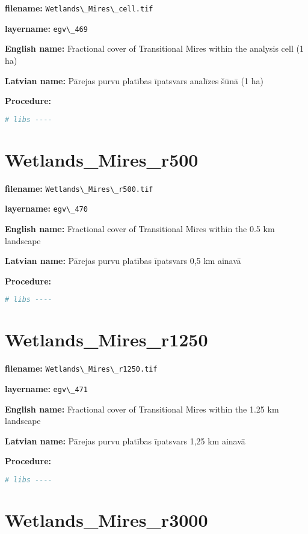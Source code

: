 \documentclass[
]{book}
\newcommand{\passthrough}[1]{#1}
\begin{document}
\textbf{filename:} \passthrough{\lstinline!Wetlands\_Mires\_cell.tif!}

\textbf{layername:} \passthrough{\lstinline!egv\_469!}

\textbf{English name:} Fractional cover of Transitional Mires within the analysis cell (1 ha)

\textbf{Latvian name:} Pārejas purvu platības īpatsvars analīzes šūnā (1 ha)

\textbf{Procedure:}

\begin{lstlisting}[language=R]
# libs ----
\end{lstlisting}

\section{Wetlands\_Mires\_r500}\label{ch06.470}

\textbf{filename:} \passthrough{\lstinline!Wetlands\_Mires\_r500.tif!}

\textbf{layername:} \passthrough{\lstinline!egv\_470!}

\textbf{English name:} Fractional cover of Transitional Mires within the 0.5 km landscape

\textbf{Latvian name:} Pārejas purvu platības īpatsvars 0,5 km ainavā

\textbf{Procedure:}

\begin{lstlisting}[language=R]
# libs ----
\end{lstlisting}

\section{Wetlands\_Mires\_r1250}\label{ch06.471}

\textbf{filename:} \passthrough{\lstinline!Wetlands\_Mires\_r1250.tif!}

\textbf{layername:} \passthrough{\lstinline!egv\_471!}

\textbf{English name:} Fractional cover of Transitional Mires within the 1.25 km landscape

\textbf{Latvian name:} Pārejas purvu platības īpatsvars 1,25 km ainavā

\textbf{Procedure:}

\begin{lstlisting}[language=R]
# libs ----
\end{lstlisting}

\section{Wetlands\_Mires\_r3000}\label{ch06.472}
\end{document}

